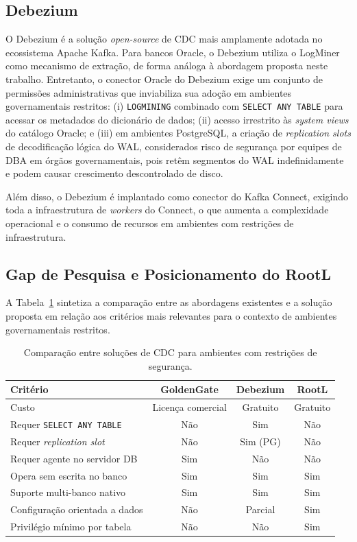 \documentclass[12pt]{article}
\begin{document}
\subsection{Debezium}

O Debezium \cite{debezium:2026} é a solução \textit{open-source} de CDC mais
amplamente adotada no ecossistema Apache Kafka. Para bancos Oracle, o Debezium
utiliza o LogMiner como mecanismo de extração, de forma análoga à abordagem
proposta neste trabalho. Entretanto, o conector Oracle do Debezium exige um
conjunto de permissões administrativas que inviabiliza sua adoção em ambientes
governamentais restritos: (i) \texttt{LOGMINING} combinado com
\texttt{SELECT ANY TABLE} para acessar os metadados do dicionário de dados;
(ii) acesso irrestrito às \textit{system views} do catálogo Oracle; e
(iii) em ambientes PostgreSQL, a criação de \textit{replication slots} de
decodificação lógica do WAL, considerados risco de segurança por equipes de
DBA em órgãos governamentais, pois retêm segmentos do WAL indefinidamente e
podem causar crescimento descontrolado de disco.

Além disso, o Debezium é implantado como conector do Kafka Connect, exigindo
toda a infraestrutura de \textit{workers} do Connect, o que aumenta a
complexidade operacional e o consumo de recursos em ambientes com restrições
de infraestrutura.

\subsection{Gap de Pesquisa e Posicionamento do RootL}

A Tabela~\ref{tab:comparison} sintetiza a comparação entre as abordagens
existentes e a solução proposta em relação aos critérios mais relevantes
para o contexto de ambientes governamentais restritos.

\begin{table}[H]
\centering
\caption{Comparação entre soluções de CDC para ambientes com restrições
  de segurança.}
\label{tab:comparison}
\begin{tabular}{|l|c|c|c|}
\hline
\textbf{Critério} & \textbf{GoldenGate} & \textbf{Debezium} & \textbf{RootL} \\
\hline
Custo & Licença comercial & Gratuito & Gratuito \\
\hline
Requer \texttt{SELECT ANY TABLE} & Não & Sim & Não \\
\hline
Requer \textit{replication slot} & Não & Sim (PG) & Não \\
\hline
Requer agente no servidor DB & Sim & Não & Não \\
\hline
Opera sem escrita no banco & Sim & Sim & Sim \\
\hline
Suporte multi-banco nativo & Sim & Sim & Sim \\
\hline
Configuração orientada a dados & Não & Parcial & Sim \\
\hline
Privilégio mínimo por tabela & Não & Não & Sim \\
\hline
\end{tabular}
\end{table}
\end{document}
